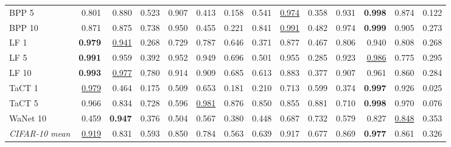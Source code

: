 \begin{table}[htbp]
\begin{adjustbox}{max width=\linewidth}
\begin{tabular}{lrrrrrrrrrrrrr}
BPP 5 & 0.801 & 0.880 & 0.523 & 0.907 & \textcolor{black!45}{0.413} & \textcolor{black!45}{0.158} & 0.541 & \underline{0.974} & \textcolor{black!45}{0.358} & 0.931 & \textbf{0.998} & 0.874 & \textcolor{black!45}{0.122} \\
BPP 10 & 0.871 & 0.875 & 0.738 & 0.950 & \textcolor{black!45}{0.455} & \textcolor{black!45}{0.221} & 0.841 & \underline{0.991} & \textcolor{black!45}{0.482} & 0.974 & \textbf{0.999} & 0.905 & \textcolor{black!45}{0.273} \\
LF 1 & \textbf{0.979} & \underline{0.941} & \textcolor{black!45}{0.268} & 0.729 & 0.787 & 0.646 & \textcolor{black!45}{0.371} & 0.877 & \textcolor{black!45}{0.467} & 0.806 & 0.940 & 0.808 & \textcolor{black!45}{0.268} \\
LF 5 & \textbf{0.991} & 0.959 & \textcolor{black!45}{0.392} & 0.952 & 0.949 & 0.696 & 0.501 & 0.955 & \textcolor{black!45}{0.285} & 0.923 & \underline{0.986} & 0.775 & \textcolor{black!45}{0.295} \\
LF 10 & \textbf{0.993} & \underline{0.977} & 0.780 & 0.914 & 0.909 & 0.685 & 0.613 & 0.883 & \textcolor{black!45}{0.377} & 0.907 & 0.961 & 0.860 & \textcolor{black!45}{0.284} \\
TaCT 1 & \underline{0.979} & \textcolor{black!45}{0.464} & \textcolor{black!45}{0.175} & 0.509 & 0.653 & \textcolor{black!45}{0.181} & \textcolor{black!45}{0.210} & 0.713 & 0.599 & \textcolor{black!45}{0.374} & \textbf{0.997} & 0.926 & \textcolor{black!45}{0.025} \\
TaCT 5 & 0.966 & 0.834 & 0.728 & 0.596 & \underline{0.981} & 0.876 & 0.850 & 0.855 & 0.881 & 0.710 & \textbf{0.998} & 0.970 & \textcolor{black!45}{0.076} \\
WaNet 10 & \textcolor{black!45}{0.459} & \textbf{0.947} & \textcolor{black!45}{0.376} & 0.504 & 0.567 & \textcolor{black!45}{0.380} & \textcolor{black!45}{0.448} & 0.687 & 0.732 & 0.579 & 0.827 & \underline{0.848} & \textcolor{black!45}{0.353} \\
\rowcolor{black!8}\emph{CIFAR-10 mean} & \underline{0.919} & 0.831 & 0.593 & 0.850 & 0.784 & 0.563 & 0.639 & 0.917 & 0.677 & 0.869 & \textbf{0.977} & 0.861 & \textcolor{black!45}{0.326} \\
\bottomrule
\end{tabular}
\end{adjustbox}
\end{table}
